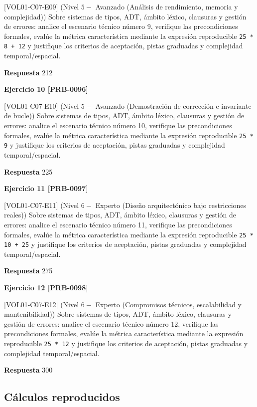 \documentclass{book}
\begin{document}
[VOL01-C07-E09] (Nivel \(5 -\) Avanzado (Análisis de rendimiento, memoria y complejidad)) Sobre sistemas de tipos, ADT, ámbito léxico, clausuras y gestión de errores: analice el escenario técnico número 9, verifique las precondiciones formales, evalúe la métrica característica mediante la expresión reproducible \texttt{25 * 8 + 12} y justifique los criterios de aceptación, pistas graduadas y complejidad temporal/espacial.

\noindent\textbf{Respuesta} 212

\noindent\textbf{Ejercicio 10 [PRB-0096]}

[VOL01-C07-E10] (Nivel \(5 -\) Avanzado (Demostración de corrección e invariante de bucle)) Sobre sistemas de tipos, ADT, ámbito léxico, clausuras y gestión de errores: analice el escenario técnico número 10, verifique las precondiciones formales, evalúe la métrica característica mediante la expresión reproducible \texttt{25 * 9} y justifique los criterios de aceptación, pistas graduadas y complejidad temporal/espacial.

\noindent\textbf{Respuesta} 225

\noindent\textbf{Ejercicio 11 [PRB-0097]}

[VOL01-C07-E11] (Nivel \(6 -\) Experto (Diseño arquitectónico bajo restricciones reales)) Sobre sistemas de tipos, ADT, ámbito léxico, clausuras y gestión de errores: analice el escenario técnico número 11, verifique las precondiciones formales, evalúe la métrica característica mediante la expresión reproducible \texttt{25 * 10 + 25} y justifique los criterios de aceptación, pistas graduadas y complejidad temporal/espacial.

\noindent\textbf{Respuesta} 275

\noindent\textbf{Ejercicio 12 [PRB-0098]}

[VOL01-C07-E12] (Nivel \(6 -\) Experto (Compromisos técnicos, escalabilidad y mantenibilidad)) Sobre sistemas de tipos, ADT, ámbito léxico, clausuras y gestión de errores: analice el escenario técnico número 12, verifique las precondiciones formales, evalúe la métrica característica mediante la expresión reproducible \texttt{25 * 12} y justifique los criterios de aceptación, pistas graduadas y complejidad temporal/espacial.

\noindent\textbf{Respuesta} 300

\subsection*{Cálculos reproducidos}
\end{document}
